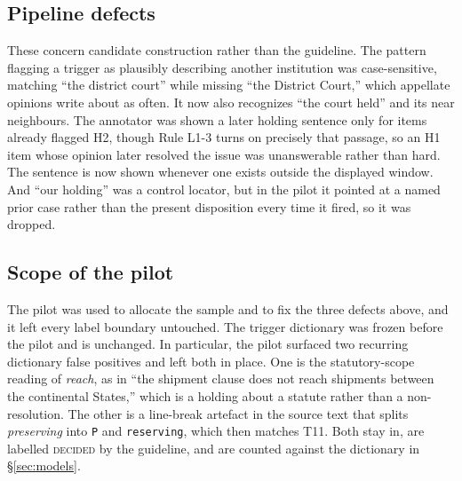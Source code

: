 \subsection{Pipeline defects} These concern candidate construction rather than
the guideline. The pattern flagging a trigger as plausibly describing another
institution was case-sensitive, matching ``the district court'' while missing
``the District Court,'' which appellate opinions write about as often. It now
also recognizes ``the court held'' and its near neighbours. The annotator was
shown a later holding sentence only for items already flagged H2, though Rule
L1-3 turns on precisely that passage, so an H1 item whose opinion later resolved
the issue was unanswerable rather than hard. The sentence is now shown whenever
one exists outside the displayed window. And ``our holding'' was a control
locator, but in the pilot it pointed at a named prior case rather than the
present disposition every time it fired, so it was dropped.

\subsection{Scope of the pilot} The pilot was used to allocate the sample and to
fix the three defects above, and it left every label boundary untouched. The
trigger dictionary was frozen before the pilot and is unchanged. In particular,
the pilot surfaced two recurring dictionary false positives and left both in
place. One is the statutory-scope reading of \emph{reach}, as in ``the shipment
clause does not reach shipments between the continental States,'' which is a
holding about a statute rather than a non-resolution. The other is a line-break
artefact in the source text that splits \emph{preserving} into \texttt{P} and
\texttt{reserving}, which then matches T11. Both stay in, are labelled
\textsc{decided} by the guideline, and are counted against the dictionary in
\S\ref{sec:models}.
